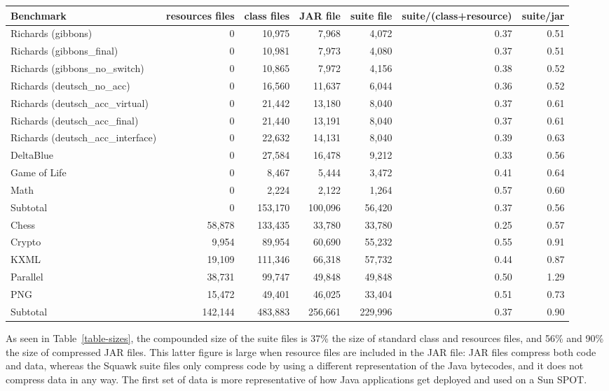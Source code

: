 \documentclass{sigplanconf}
\newcommand{\doublecentertablebegin}{\begin{table*}[htp] \begin{center}}
\newcommand{\doublecentertableend}[2]{{\bf \caption{\label{#1} {#2}}} \end{center} \end{table*} }
\begin{document}
\doublecentertablebegin
\begin{tabular}{|l|r|r|r|r|r|r|} \hline
Benchmark & resources files & class files & JAR file & suite file & suite/(class+resource) & suite/jar \\ \hline
Richards (gibbons) &                 0 & 10,975 & 7,968  & 4,072 & 0.37 & 0.51 \\
Richards (gibbons\_final) &          0 & 10,981 & 7,973  & 4,080 & 0.37 & 0.51 \\
Richards (gibbons\_no\_switch) &     0 & 10,865 & 7,972  & 4,156 & 0.38 & 0.52 \\
Richards (deutsch\_no\_acc) &        0 & 16,560 & 11,637 & 6,044 & 0.36 & 0.52 \\
Richards (deutsch\_acc\_virtual) &   0 & 21,442 & 13,180 & 8,040 & 0.37 & 0.61 \\
Richards (deutsch\_acc\_final) &     0 & 21,440 & 13,191 & 8,040 & 0.37 & 0.61 \\
Richards (deutsch\_acc\_interface) & 0 & 22,632 & 14,131 & 8,040 & 0.39 & 0.63 \\
DeltaBlue &                          0 & 27,584 & 16,478 & 9,212 & 0.33 & 0.56 \\
Game of Life &                       0 & 8,467  &  5,444 & 3,472 & 0.41 & 0.64 \\
Math &                               0 & 2,224  &  2,122 & 1,264 & 0.57 & 0.60 \\ \hline
Subtotal &                          0 & 153,170 & 100,096 & 56,420 & 0.37 & 0.56 \\ \hline \hline
Chess &                        58,878 & 133,435 &  33,780 & 33,780 & 0.25 & 0.57 \\
Crypto &                        9,954 &  89,954 &  60,690 & 55,232 & 0.55 & 0.91 \\
KXML &                         19,109 & 111,346 &  66,318 & 57,732 & 0.44 & 0.87 \\
Parallel &                     38,731 &  99,747 &  49,848 & 49,848 & 0.50 & 1.29 \\
PNG &                          15,472 &  49,401 &  46,025 & 33,404 & 0.51 & 0.73 \\ \hline
Subtotal &                    142,144 & 483,883 & 256,661 & 229,996 & 0.37 & 0.90\\ \hline \hline
\end{tabular}
\doublecentertableend{table-sizes}{Class File, JAR, and Suite File Size Comparison in Bytes}

As seen in Table~\ref{table-sizes}, the compounded size of the suite files is 37\% 
the size of standard class and resources files, and 56\% and 90\% the size of 
compressed JAR files.  This latter figure is large when resource files are included
in the JAR file: JAR files compress both code and data, whereas the Squawk suite 
files only compress code by using a different representation of the Java 
bytecodes, and it does not compress data in any way. 
The first set of data is more representative of how Java applications get deployed
and used on a Sun SPOT. 
\end{document}
